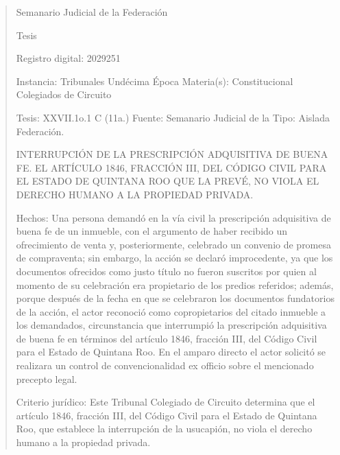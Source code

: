 \documentclass[11pt,a4paper]{article}
\begin{document}
\begin{quote}
                                                   Semanario Judicial de la Federación

                                                Tesis

 Registro digital: 2029251

 Instancia: Tribunales             Undécima Época                         Materia(s): Constitucional
 Colegiados de Circuito

 Tesis: XXVII.1o.1 C (11a.)        Fuente: Semanario Judicial de la       Tipo: Aislada
                                   Federación.


INTERRUPCIÓN DE LA PRESCRIPCIÓN ADQUISITIVA DE BUENA FE. EL ARTÍCULO 1846,
FRACCIÓN III, DEL CÓDIGO CIVIL PARA EL ESTADO DE QUINTANA ROO QUE LA PREVÉ, NO
VIOLA EL DERECHO HUMANO A LA PROPIEDAD PRIVADA.


Hechos: Una persona demandó en la vía civil la prescripción adquisitiva de buena fe de un
inmueble, con el argumento de haber recibido un ofrecimiento de venta y, posteriormente, celebrado
un convenio de promesa de compraventa; sin embargo, la acción se declaró improcedente, ya que
los documentos ofrecidos como justo título no fueron suscritos por quien al momento de su
celebración era propietario de los predios referidos; además, porque después de la fecha en que se
celebraron los documentos fundatorios de la acción, el actor reconoció como copropietarios del
citado inmueble a los demandados, circunstancia que interrumpió la prescripción adquisitiva de
buena fe en términos del artículo 1846, fracción III, del Código Civil para el Estado de Quintana Roo.
En el amparo directo el actor solicitó se realizara un control de convencionalidad ex officio sobre el
mencionado precepto legal.

Criterio jurídico: Este Tribunal Colegiado de Circuito determina que el artículo 1846, fracción III, del
Código Civil para el Estado de Quintana Roo, que establece la interrupción de la usucapión, no viola
el derecho humano a la propiedad privada.


\end{quote}
\end{document}
